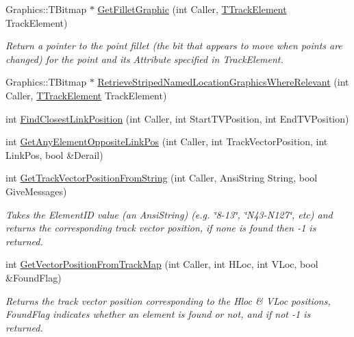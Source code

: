 \begin{DoxyCompactItemize}
\mbox{\label{class_t_track_a28019284fc6a90e06fc4b27e011484fa}} 
Graphics\+::\+T\+Bitmap $\ast$ \mbox{\hyperlink{class_t_track_a28019284fc6a90e06fc4b27e011484fa}{Get\+Fillet\+Graphic}} (int Caller, \mbox{\hyperlink{class_t_track_element}{T\+Track\+Element}} Track\+Element)
\begin{DoxyCompactList}\small\item\em Return a pointer to the point fillet (the bit that appears to move when points are changed) for the point and its Attribute specified in Track\+Element. \end{DoxyCompactList}\item 
Graphics\+::\+T\+Bitmap $\ast$ \mbox{\hyperlink{class_t_track_a10027e5b78eb6dfdc246613d78aab53e}{Retrieve\+Striped\+Named\+Location\+Graphics\+Where\+Relevant}} (int Caller, \mbox{\hyperlink{class_t_track_element}{T\+Track\+Element}} Track\+Element)
\item 
int \mbox{\hyperlink{class_t_track_a0510eacbf80200ff27d991606acf9924}{Find\+Closest\+Link\+Position}} (int Caller, int Start\+T\+V\+Position, int End\+T\+V\+Position)
\item 
int \mbox{\hyperlink{class_t_track_a5b63dde2b21a37d5db7e4d078b03a74c}{Get\+Any\+Element\+Opposite\+Link\+Pos}} (int Caller, int Track\+Vector\+Position, int Link\+Pos, bool \&Derail)
\item 
\mbox{\label{class_t_track_a54d3b9daeb9ec0b45b0672e7273bf575}} 
int \mbox{\hyperlink{class_t_track_a54d3b9daeb9ec0b45b0672e7273bf575}{Get\+Track\+Vector\+Position\+From\+String}} (int Caller, Ansi\+String String, bool Give\+Messages)
\begin{DoxyCompactList}\small\item\em Takes the Element\+ID value (an Ansi\+String) (e.\+g. \char`\"{}8-\/13\char`\"{}, \char`\"{}\+N43-\/\+N127\char`\"{}, etc) and returns the corresponding track vector position, if none is found then -\/1 is returned. \end{DoxyCompactList}\item 
\mbox{\label{class_t_track_aa0812972d1ae27198c5fbca8aa7b6134}} 
int \mbox{\hyperlink{class_t_track_aa0812972d1ae27198c5fbca8aa7b6134}{Get\+Vector\+Position\+From\+Track\+Map}} (int Caller, int H\+Loc, int V\+Loc, bool \&Found\+Flag)
\begin{DoxyCompactList}\small\item\em Returns the track vector position corresponding to the Hloc \& V\+Loc positions, Found\+Flag indicates whether an element is found or not, and if not -\/1 is returned. \end{DoxyCompactList}\item 

\end{DoxyCompactItemize}
